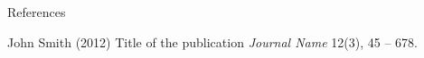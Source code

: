 \documentclass[12pt]{beamer}
\begin{document}

\begin{frame}{References}
    \footnotesize{
        \begin{thebibliography}{99}
             John Smith (2012)
            \newblock Title of the publication
            \newblock \emph{Journal Name} 12(3), 45 -- 678.
        \end{thebibliography}
    }
\end{frame}
\end{document}
